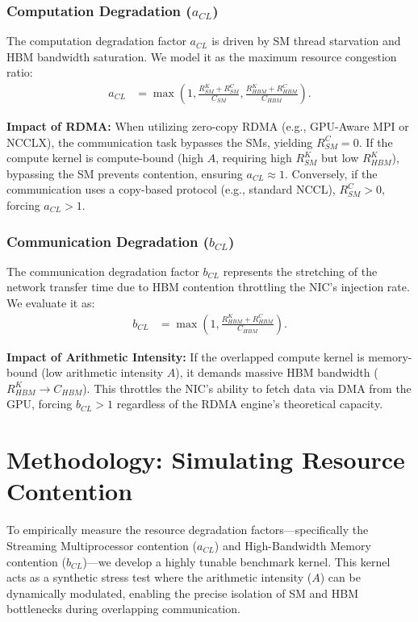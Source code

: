 \documentclass[twocolumn, secnumarabic, amssymb, nobibnotes, aps, prd, amsmath, nofootinbib]{revtex4-2}
\begin{document}
\subsubsection{Computation Degradation ($a_{CL}$)}
The computation degradation factor $a_{CL}$ is driven by SM thread starvation and HBM bandwidth saturation. We model it as the maximum resource congestion ratio:
\begin{align*}
    a_{CL} &= \max\left(1, \frac{R_{SM}^K + R_{SM}^C}{C_{SM}}, \frac{R_{HBM}^K + R_{HBM}^C}{C_{HBM}}\right).
\end{align*}

\textbf{Impact of RDMA:} When utilizing zero-copy RDMA (e.g., GPU-Aware MPI or NCCLX), the communication task bypasses the SMs, yielding $R_{SM}^C = 0$. If the compute kernel is compute-bound (high $A$, requiring high $R_{SM}^K$ but low $R_{HBM}^K$), bypassing the SM prevents contention, ensuring $a_{CL} \approx 1$. Conversely, if the communication uses a copy-based protocol (e.g., standard NCCL), $R_{SM}^C > 0$, forcing $a_{CL} > 1$.

\subsubsection{Communication Degradation ($b_{CL}$)}
The communication degradation factor $b_{CL}$ represents the stretching of the network transfer time due to HBM contention throttling the NIC's injection rate. We evaluate it as:
\begin{align*}
    b_{CL} &= \max\left(1, \frac{R_{HBM}^K + R_{HBM}^C}{C_{HBM}}\right).
\end{align*}

\textbf{Impact of Arithmetic Intensity:} If the overlapped compute kernel is memory-bound (low arithmetic intensity $A$), it demands massive HBM bandwidth ($R_{HBM}^K \to C_{HBM}$). This throttles the NIC's ability to fetch data via DMA from the GPU, forcing $b_{CL} > 1$ regardless of the RDMA engine's theoretical capacity.

\section{Methodology: Simulating Resource Contention} \label{sect:methodology}

To empirically measure the resource degradation factors—specifically the Streaming Multiprocessor contention ($a_{CL}$) and High-Bandwidth Memory contention ($b_{CL}$)—we develop a highly tunable benchmark kernel. This kernel acts as a synthetic stress test where the arithmetic intensity ($A$) can be dynamically modulated, enabling the precise isolation of SM and HBM bottlenecks during overlapping communication.
\end{document}
